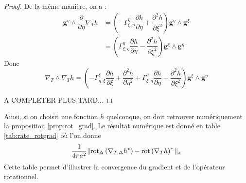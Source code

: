 \begin{proof}
De la même manière, on a :
\begin{align*}
\mathbf{g}^{\eta} \wedge \dfrac{\partial}{\partial \eta} \nabla_T h & = \left( - \Gamma_{\xi, \eta}^{\eta} \dfrac{\partial h}{\partial \eta} + \dfrac{\partial^2 h}{\partial \xi^2} \right) \mathbf{g}^{\eta} \wedge \mathbf{g}^{\xi}\\
&  = \left( \Gamma_{\xi, \eta}^{\eta} \dfrac{\partial h}{\partial \eta} - \dfrac{\partial^2 h}{\partial \xi^2} \right) \mathbf{g}^{\xi} \wedge \mathbf{g}^{\eta}
\end{align*}
Donc 
\begin{equation}
\nabla_T \wedge \nabla_T h = \left( - \Gamma_{\eta, \xi}^{\xi} \dfrac{\partial h}{\partial \xi} + \dfrac{\partial^2 h}{\partial \eta^2} +  \Gamma_{\xi, \eta}^{\eta} \dfrac{\partial h}{\partial \eta} - \dfrac{\partial^2 h}{\partial \xi^2} \right) \mathbf{g}^{\xi} \wedge \mathbf{g}^{\eta}
\end{equation}

A COMPLETER PLUS TARD...

\end{proof}

Ainsi, si on choisit une fonction $h$ quelconque, on doit retrouver numériquement la proposition \ref{prop:rot_grad}. Le résultat numérique est donné en table \ref{tab:rate_rotgrad} où l'on donne
\begin{equation}
\dfrac{1}{4 \pi a^2} \| \text{rot}_{\Delta} \left( \nabla_{T,\Delta} h^* \right) - \text{rot} \left( \nabla_{T} h \right)^* \|_s
\end{equation}
Cette table permet d'illustrer la convergence du gradient et de l'opérateur rotationnel.

